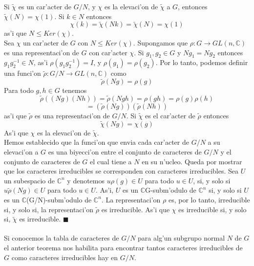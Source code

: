 \documentclass[a4paper,openright,12pt]{book}
\numberwithin{equation}{section} %
\newenvironment{proof}{\noindent{\it Demostracion:}}{\hfill$\blacksquare$} %
\begin{document}
\begin{proof}
Si $\tilde \chi$ es un car'acter de $G/N$, y $\chi$ es la elevaci'on de $\tilde \chi$ a $G$, entonces $\tilde \chi (N) = \chi (1)$. Si $k \in N$ entonces 
\[
\chi (k)=\tilde \chi (Nk) = \tilde \chi (N) = \chi (1)
\]
as'i que $N \leq Ker (\chi)$.\\
Sea $\chi$ un car'acter de $G$ con $N \leq Ker (\chi)$. Supongamos que $\rho : G \rightarrow GL(n, \mathbb{C})$ es una representaci'on de $G$ con car'acter $\chi$. Si $g_{1},g_{2} \in G$ y $Ng_{1}=Ng_{2}$ entonces $g_{1}g_{2}^{-1} \in N$, as'i $\rho (g_{1}g_{2}^{-1})=I$, y $\rho (g_{1}) = \rho (g_{2})$. Por lo tanto, podemos definir una funci'on $\tilde \rho : G/N \rightarrow GL(n, \mathbb{C})$ como
\[
\tilde \rho (Ng) = \rho (g)
\]
Para todo $g, h \in G$ tenemos
\[
\tilde \rho ((Ng)(Nh)) = \tilde \rho (Ngh) = \rho (gh) = \rho (g) \rho (h)
\]
\[
=(\tilde \rho (Ng))(\tilde \rho (Nh))
\]
as'i que $\tilde \rho$ es una representaci'on de $G/N$. Si $\tilde \chi$ es el car'acter de $\tilde \rho$ entonces
\[
\tilde \chi (Ng)= \chi (g)
\]
As'i que $\chi$ es la elevaci'on de $\tilde \chi$.\\
Hemos establecido que la funci'on que envia cada car'acter de $G/N$ a su elevaci'on a $G$ es una biyecci'on entre el conjunto de caracteres de $G/N$ y el conjunto de caracteres de $G$ el cual tiene a $N$ en su n'ucleo. Queda por mostrar que los caracteres irreducibles se corresponden con caracteres irreducibles. Sea $U$ un subespacio de $\mathbb{C}^{n}$ y denotemos $u \rho(g) \in U$ para todo $u \in U$, si, y solo si $u \tilde \rho (Ng) \in U$ para todo $u \in U$. 
As'i, $U$ es un $\mathbb{C}$G-subm'odulo de $\mathbb{C}^{n}$ si, y solo si $U$ es un $\mathbb{C}$(G/N)-subm'odulo de $\mathbb{C}^{n}$. La representaci'on $\rho$ es, por lo tanto, irreducible si, y solo si, la representaci'on $\tilde \rho$ es irreducible. As'i que $\chi$ es irreducible si, y solo si, $\tilde \chi$ es irreducible. 
\end{proof}\\
\\
Si conocemos la tabla de caracteres de $G/N$ para alg'un subgrupo normal $N$ de $G$ el anterior teorema nos habilita para encontrar tantos caracteres irreducibles de $G$ como caracteres irreducibles hay en $G/N$.
\end{document}
